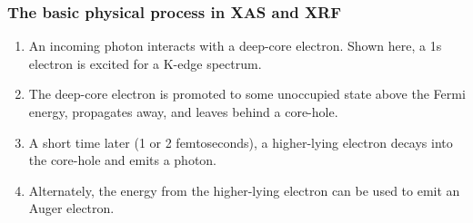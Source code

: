 \documentclass[10pt, xcolor=x11names, compress]{beamer}
\begin{document}
\begin{frame}
  \frametitle{The basic physical process in XAS and XRF}

  \begin{center}
%
%
  \end{center}


  \begin{enumerate}[<+->]
  \item An incoming photon interacts with a deep-core electron.  Shown
    here, a 1s electron is excited for a K-edge spectrum.
  \item The deep-core electron is promoted to some unoccupied state
    above the Fermi energy, propagates away, and leaves behind a
    core-hole.
  \item A short time later (1 or 2 femtoseconds), a higher-lying
    electron decays into the core-hole and emits a photon.
  \item Alternately, the energy from the higher-lying electron can be
    used to emit an Auger electron.
  \end{enumerate}
\end{frame}
\end{document}
